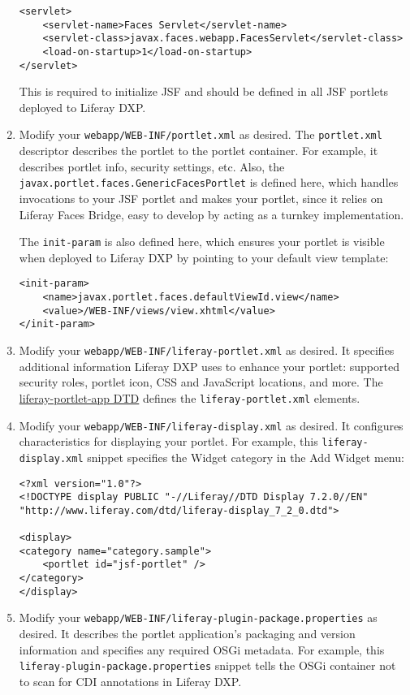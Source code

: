 \begin{enumerate}
\begin{verbatim}
<servlet>
    <servlet-name>Faces Servlet</servlet-name>
    <servlet-class>javax.faces.webapp.FacesServlet</servlet-class>
    <load-on-startup>1</load-on-startup>
</servlet>
\end{verbatim}

  This is required to initialize JSF and should be defined in all JSF
  portlets deployed to Liferay DXP.
\item
  Modify your \texttt{webapp/WEB-INF/portlet.xml} as desired. The
  \texttt{portlet.xml} descriptor describes the portlet to the portlet
  container. For example, it describes portlet info, security settings,
  etc. Also, the \texttt{javax.portlet.faces.GenericFacesPortlet} is
  defined here, which handles invocations to your JSF portlet and makes
  your portlet, since it relies on Liferay Faces Bridge, easy to develop
  by acting as a turnkey implementation.

  The \texttt{init-param} is also defined here, which ensures your
  portlet is visible when deployed to Liferay DXP by pointing to your
  default view template:

\begin{verbatim}
<init-param>
    <name>javax.portlet.faces.defaultViewId.view</name>
    <value>/WEB-INF/views/view.xhtml</value>
</init-param>
\end{verbatim}
\item
  Modify your \texttt{webapp/WEB-INF/liferay-portlet.xml} as desired. It
  specifies additional information Liferay DXP uses to enhance your
  portlet: supported security roles, portlet icon, CSS and JavaScript
  locations, and more. The
  \href{https://docs.liferay.com/dxp/portal/7.2-latest/definitions/liferay-portlet-app_7_2_0.dtd.html}{liferay-portlet-app
  DTD} defines the \texttt{liferay-portlet.xml} elements.
\item
  Modify your \texttt{webapp/WEB-INF/liferay-display.xml} as desired. It
  configures characteristics for displaying your portlet. For example,
  this \texttt{liferay-display.xml} snippet specifies the Widget
  category in the Add Widget menu:

\begin{verbatim}
<?xml version="1.0"?>
<!DOCTYPE display PUBLIC "-//Liferay//DTD Display 7.2.0//EN" "http://www.liferay.com/dtd/liferay-display_7_2_0.dtd">

<display>
<category name="category.sample">
    <portlet id="jsf-portlet" />
</category>
</display>
\end{verbatim}
\item
  Modify your \texttt{webapp/WEB-INF/liferay-plugin-package.properties}
  as desired. It describes the portlet application's packaging and
  version information and specifies any required OSGi metadata. For
  example, this \texttt{liferay-plugin-package.properties} snippet tells
  the OSGi container not to scan for CDI annotations in Liferay DXP.


\end{enumerate}
